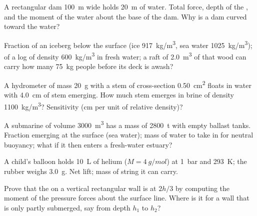 \begin{exercise}[$\star\star$]\label{exo:b1:fluid-statics:6}
A rectangular dam \qty{100}{m} wide holds \qty{20}{m} of water. Total
force, depth of the , and the moment of the water
about the base of the dam. Why is a dam curved toward the water?
\end{exercise}

\begin{exercise}[$\star\star$]\label{exo:b1:fluid-statics:7}
Fraction of an iceberg below the surface (ice \qty{917}{kg/m^3}, sea water
\qty{1025}{kg/m^3}); of a log of density \qty{600}{kg/m^3} in fresh water;
a raft of \qty{2.0}{m^3} of that wood can carry how many \qty{75}{kg}
people before its deck is awash?
\end{exercise}

\begin{exercise}[$\star\star$]\label{exo:b1:fluid-statics:8}
A hydrometer of mass \qty{20}{g} with a stem of cross-section
\qty{0.50}{cm^2} floats in water with \qty{4.0}{cm} of stem emerging.
How much stem emerges in brine of density \qty{1100}{kg/m^3}? Sensitivity
(cm per unit of relative density)?
\end{exercise}

\begin{exercise}[$\star\star$]\label{exo:b1:fluid-statics:9}
A submarine of volume \qty{3000}{m^3} has a mass of \qty{2800}{t} with empty
ballast tanks. Fraction emerging at the surface (sea water); mass of
water to take in for neutral buoyancy; what if it then enters a
fresh-water estuary?
\end{exercise}

\begin{exercise}[$\star\star\star$]\label{exo:b1:fluid-statics:10}
A child's balloon holds \qty{10}{L} of helium ($M = \qty{4}{g/mol}$) at
\qty{1}{bar} and \qty{293}{K}; the rubber weighs \qty{3.0}{g}. Net lift;
mass of string it can carry.
\end{exercise}

\begin{exercise}[$\star\star\star$]\label{exo:b1:fluid-statics:11}
Prove that the  on a vertical rectangular wall is at
$2h/3$ by computing the moment of the pressure forces about the surface
line. Where is it for a wall that is only partly submerged, say from
depth $h_1$ to $h_2$?
\end{exercise}

